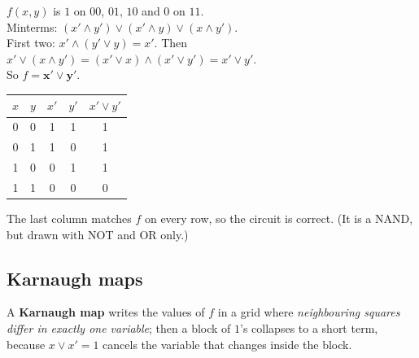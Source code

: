 \documentclass{fkt-notes}
\theoremstyle{definition}
\begin{document}
\begin{example}
  \leavevmode\par\noindent
  \begin{minipage}[c]{0.4\textwidth}
    $f(x,y)$ is $1$ on $00$, $01$, $10$ and $0$ on $11$.\\[2pt]
    Minterms: $(x'\wedge y')\vee(x'\wedge y)\vee(x\wedge y')$.\\[2pt]
    First two: $x'\wedge(y'\vee y)=x'$. Then
    $x'\vee(x\wedge y')=(x'\vee x)\wedge(x'\vee y')=x'\vee y'$.\\[2pt]
    So $f=\mathbf{x'\vee y'}$.
  \end{minipage}\hfill
  \begin{minipage}[c]{0.27\textwidth}
    \centering
  \end{minipage}\hfill
  \begin{minipage}[c]{0.28\textwidth}
    \small
    \begin{tabular}{@{}cc|cc|c@{}}
      $x$ & $y$ & $x'$ & $y'$ & $x'\vee y'$ \\\hline
      0   & 0   & 1    & 1    & 1           \\
      0   & 1   & 1    & 0    & 1           \\
      1   & 0   & 0    & 1    & 1           \\
      1   & 1   & 0    & 0    & 0
    \end{tabular}
  \end{minipage}

  \smallskip
  The last column matches $f$ on every row, so the circuit is correct.
  (It is a NAND, but drawn with NOT and OR only.)
\end{example}

\subsection{Karnaugh maps}
%
A \textbf{Karnaugh map} writes the values of $f$ in a grid where
\emph{neighbouring squares differ in exactly one variable}; then a block
of $1$'s collapses to a short term, because $x\vee x'=1$ cancels the
variable that changes inside the block.
\end{document}
